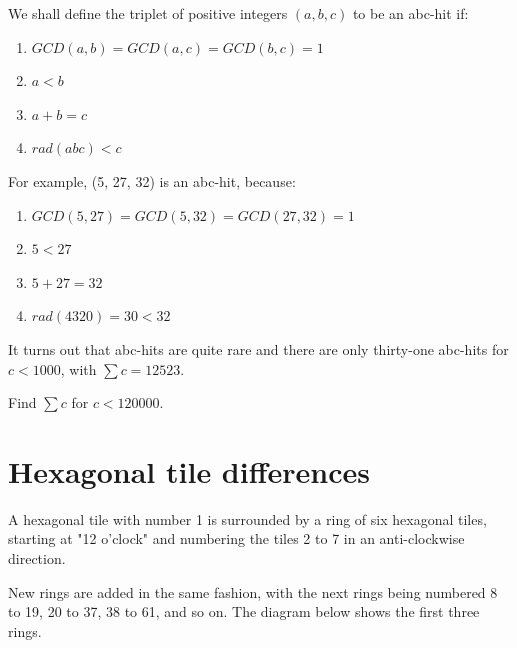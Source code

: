 We shall define the triplet of positive integers $(a, b, c)$ to be an abc-hit if:

\begin{enumerate}
    \item $GCD(a, b) = GCD(a, c) = GCD(b, c) = 1$
    \item $a < b$
    \item $a + b = c$
    \item $rad(abc) < c$
\end{enumerate}
For example, (5, 27, 32) is an abc-hit, because:

\begin{enumerate}
    \item $GCD(5, 27) = GCD(5, 32) = GCD(27, 32) = 1$
    \item $5 < 27$
    \item $5 + 27 = 32$
    \item $rad(4320) = 30 < 32$
\end{enumerate}

It turns out that abc-hits are quite rare and there are only thirty-one abc-hits for $c < 1000$, with $\sum c = 12523$.

Find $\sum c$ for $c < 120000$.


\section{Hexagonal tile differences} \label{pb.0128}

A hexagonal tile with number 1 is surrounded by a ring of six hexagonal tiles, starting at "12 o'clock" and numbering the tiles 2 to 7 in an anti-clockwise direction.

New rings are added in the same fashion, with the next rings being numbered 8 to 19, 20 to 37, 38 to 61, and so on. The diagram below shows the first three rings.

\begin{center}
\end{center}

